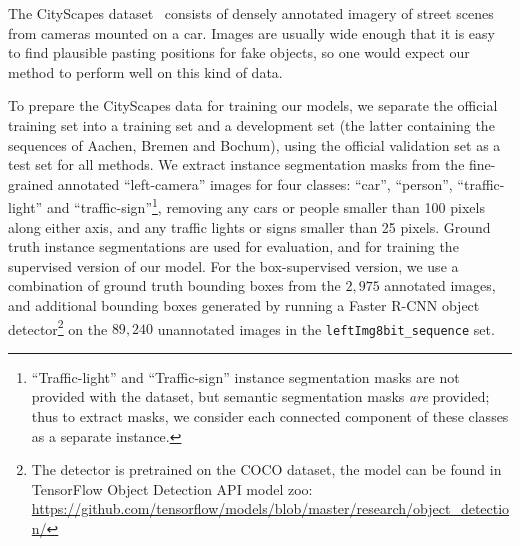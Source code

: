 \documentclass[runningheads]{llncs}
\begin{document}
The CityScapes dataset~\cite{Cordts2016Cityscapes} 
consists of densely annotated imagery of
street scenes from cameras mounted on a car. Images are usually wide enough that it is easy to find plausible pasting positions for fake objects, so one would expect our method to perform well on this kind of data.

To prepare the CityScapes data for training our models,
we separate the official training set into a training set and a development set (the latter containing the sequences of Aachen, Bremen and Bochum), using
the official validation set as a test set for all methods. 
We extract instance segmentation masks from the fine-grained annotated ``left-camera'' images for four classes: 
``car'', ``person'', ``traffic-light'' and ``traffic-sign''\footnote{``Traffic-light'' and ``Traffic-sign'' instance segmentation masks are not provided with the dataset, but semantic segmentation masks \emph{are} provided; thus to extract masks, we consider each connected component of these classes as a separate instance.},
removing any
cars or people smaller than 100 pixels along either axis, 
and any traffic lights or signs smaller than 25 pixels. 
Ground truth instance segmentations are used for evaluation, and for training the supervised version of our model. For the box-supervised version, we use a combination of ground truth bounding boxes from the $2,975$ annotated images, and additional bounding boxes generated by running a Faster R-CNN object detector\footnote{The detector is pretrained on the COCO dataset, the model can be found in TensorFlow Object Detection API model zoo:
\url{https://github.com/tensorflow/models/blob/master/research/object_detection/}}
on the $89,240$ unannotated images in the \texttt{leftImg8bit\_sequence} set.
\end{document}
